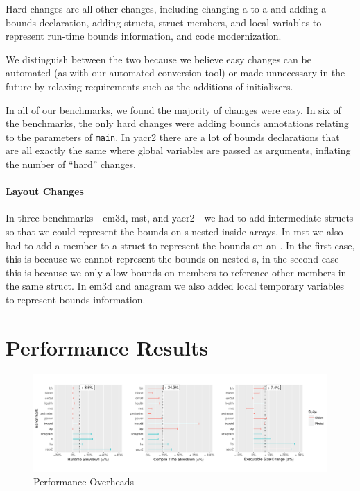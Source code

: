 Hard changes are all other changes, including changing a
\uncheckedptrT{} to a \ArrayptrT{} and adding a bounds declaration,
adding structs, struct members, and local variables to represent
run-time bounds information, and code modernization.

We distinguish between the two because we believe easy changes can be
automated (as with our automated \PtrT{} conversion tool) or made
unnecessary in the future by relaxing requirements such as the
additions of initializers.

In all of our benchmarks, we found the majority of changes were easy.
In six of the benchmarks, the only hard changes were adding bounds
annotations relating to the parameters of \lstinline|main|. In yacr2
there are a lot of bounds declarations that are all exactly the same
where global variables are passed as arguments, inflating the number
of ``hard'' changes.

\paragraph{Layout Changes} In three benchmarks---em3d, mst, and
yacr2---we had to add intermediate structs so that we could represent
the bounds on \ArrayptrT{}s nested inside arrays. In mst we also had
to add a member to a struct to represent the bounds on an
\ArrayptrT{}. In the first case, this is because we cannot represent
the bounds on nested \ArrayptrT{}s, in the second case this is because
we only allow bounds on members to reference other members in the same
struct. In em3d and anagram we also added local temporary variables to
represent bounds information.

\section{Performance Results}

\begin{figure}[ht]
\centering
\includegraphics[width=\linewidth]{scripts/overheads}
\caption{Performance Overheads}
\label{fig:oh-plot}
\end{figure}

